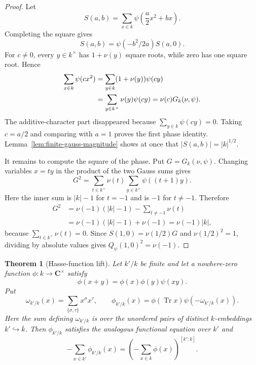 \documentclass[11pt]{amsart}
\newtheorem{theorem}{Theorem}[section]
\theoremstyle{definition}
\theoremstyle{remark}
\newcommand{\C}{\mathbf C}
\newcommand{\Tr}{\operatorname{Tr}}
\begin{document}
\begin{proof}
Let
\[
 S(a,b)=\sum_{x\in k}\psi\left(\frac a2x^2+bx\right).
\]
Completing the square gives
\[
 S(a,b)=\psi(-b^2/2a)S(a,0).
\]
For $c\ne0$, every $y\in k^\times$ has $1+\nu(y)$ square roots, while
zero has one square root.  Hence
\begin{align}
 \sum_{x\in k}\psi(cx^2)
 &=\sum_{y\in k}(1+\nu(y))\psi(cy)\notag\\
 &=\sum_{y\in k^\times}\nu(y)\psi(cy)
  =\nu(c)G_k(\nu,\psi).\label{eq:quad-gauss}
\end{align}
The additive-character part disappeared because
$\sum_{y\in k}\psi(cy)=0$.  Taking $c=a/2$ and comparing with $a=1$
proves the first phase identity.  Lemma~\ref{lem:finite-gauss-magnitude}
shows at once that $|S(a,b)|=|k|^{1/2}$.

It remains to compute the square of the phase.  Put
$G=G_k(\nu,\psi)$.  Changing variables $x=ty$ in the product of the
two Gauss sums gives
\[
 G^2=\sum_{t\in k^\times}\nu(t)
       \sum_{y\in k^\times}\psi((t+1)y).
\]
Here the inner sum is $|k|-1$ for $t=-1$ and is $-1$ for
$t\ne-1$.  Therefore
\[
 \begin{aligned}
 G^2
 &=\nu(-1)(|k|-1)-\sum_{t\ne-1}\nu(t)\\
 &=\nu(-1)(|k|-1)+\nu(-1)
  =\nu(-1)|k|,
 \end{aligned}
\]
because $\sum_{t\in k^\times}\nu(t)=0$.  Since
$S(1,0)=\nu(1/2)G$ and $\nu(1/2)^2=1$, dividing by absolute values
gives $Q_\psi(1,0)^2=\nu(-1)$.
\end{proof}

\begin{theorem}[Hasse-function lift]\label{thm:Hasse-lift}
Let $k'/k$ be finite and let a nowhere-zero function $\phi:k\to\C^\times$
satisfy
\[
 \phi(x+y)=\phi(x)\phi(y)\psi(xy).
\]
Put
\[
 \omega_{k'/k}(x)=\sum_{\{\sigma,\tau\}}x^\sigma x^\tau,
 \qquad
 \phi_{k'/k}(x)=
 \phi(\Tr x)\psi(-\omega_{k'/k}(x)).
\]
Here the sum defining $\omega_{k'/k}$ is over the unordered pairs of
distinct $k$-embeddings $k'\hookrightarrow\overline{k}$.  Then
$\phi_{k'/k}$ satisfies the analogous functional equation over
$k'$ and
\begin{equation}\label{eq:Hasse-lift-sum}
 -\sum_{x\in k'}\phi_{k'/k}(x)
 =\left(-\sum_{x\in k}\phi(x)\right)^{[k':k]}.
\end{equation}
\end{theorem}
\end{document}
